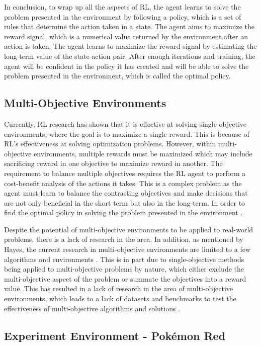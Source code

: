 In conclusion, to wrap up all the aspects of RL, the agent learns to solve the problem presented in the environment by following a policy, which is a set of rules that determine the action taken in a state. The agent aims to maximize the reward signal, which is a numerical value returned by the environment after an action is taken. The agent learns to maximize the reward signal by estimating the long-term value of the state-action pair. After enough iterations and training, the agent will be confident in the policy it has created and will be able to solve the problem presented in the environment, which is called the optimal policy.

\subsection{Multi-Objective Environments}

Currently, RL research has shown that it is effective at solving single-objective environments, where the goal is to maximize a single reward. This is because of RL's effectiveness at solving optimization problems. However, within multi-objective environments, multiple rewards must be maximized which may include sacrificing reward in one objective to maximize reward in another. The requirement to balance multiple objectives requires the RL agent to perform a cost-benefit analysis of the actions it takes. This is a complex problem as the agent must learn to balance the contrasting objectives and make decisions that are not only beneficial in the short term but also in the long-term. In order to find the optimal policy in solving the problem presented in the environment \cite{hayes2022practical}. 

Despite the potential of multi-objective environments to be applied to real-world problems, there is a lack of research in the area. In addition, as mentioned by Hayes, the current research in multi-objective environments are limited to a few algorithms and environments \cite{hayes2022practical}. This is in part due to single-objective methods being applied to multi-objective problems by nature, which either exclude the multi-objective aspect of the problem or summate the objectives into a reward value. This has resulted in a lack of research in the area of multi-objective environments, which leads to a lack of datasets and benchmarks to test the effectiveness of multi-objective algorithms and solutions \cite{hayes2022practical}.

\subsection{Experiment Environment - Pokémon Red}

